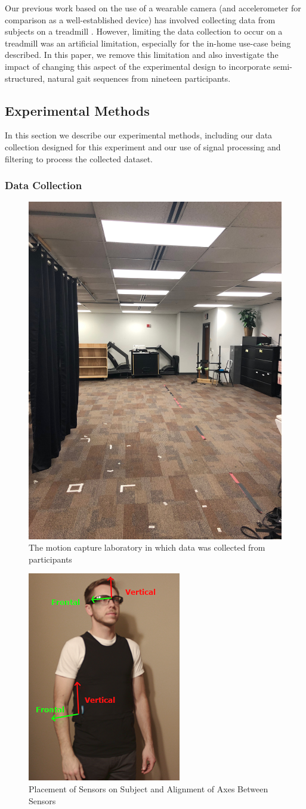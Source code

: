 \documentclass[12pt]{report}
\begin{document}
Our previous work based on the use of a wearable camera (and accelerometer for comparison as a well-established device) has involved collecting data from subjects on a treadmill \cite{Schneider2017}. However, limiting the data collection to occur on a treadmill was an artificial limitation, especially for the in-home use-case being described. In this paper, we remove this limitation and also investigate the impact of changing this aspect of the experimental design to incorporate semi-structured, natural gait sequences from nineteen participants.

\subsection{Experimental Methods}
In this section we describe our experimental methods, including our data collection designed for this experiment and our use of signal processing and filtering to process the collected dataset.

\subsubsection{Data Collection}

\begin{figure}[!t]
\centering
\includegraphics[width=1.8 in]{figure/MoCapRoom}
\caption{The motion capture laboratory in which data was collected from participants}
\label{fig_mocap}
\end{figure}

\begin{figure}[!t]
\centering
\includegraphics[width=1.8 in]{figure/sensorAlign}
\caption{Placement of Sensors on Subject and Alignment of Axes Between Sensors}
\label{fig_axes}
\end{figure}
\end{document}
